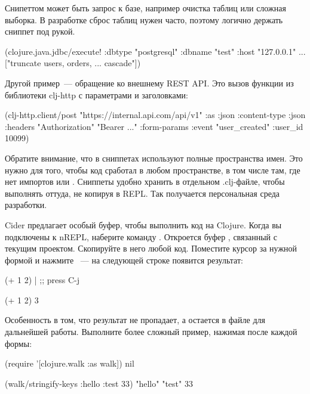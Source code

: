 Снипеттом может быть запрос к базе, например очистка таблиц или сложная выборка. В разработке сброс таблиц нужен часто, поэтому логично держать сниппет под рукой.

\begin{english}
  \begin{clojure}
(clojure.java.jdbc/execute!
 {:dbtype "postgresql"
  :dbname "test"
  :host "127.0.0.1"
  ...}
 ["truncate users, orders, ... cascade"])
  \end{clojure}
\end{english}

Другой пример~--- обращение ко внешнему REST API. Это вызов функции  из библиотеки clj-http с параметрами и заголовками:

\begin{english}
  \begin{clojure}
(clj-http.client/post
 "https://internal.api.com/api/v1"
 {:as :json
  :content-type :json
  :headers {"Authorization" "Bearer ..."}
  :form-params {:event "user_created"
                :user_id 10099}})
  \end{clojure}
\end{english}

Обратите внимание, что в сниппетах используют полные пространства имен. Это нужно для того, чтобы код сработал в любом пространстве, в том числе там, где нет импортов  или . Сниппеты удобно хранить в отдельном .clj-файле, чтобы выполнять оттуда, не копируя в REPL. Так получается персональная среда разработки.

Cider предлагает особый буфер, чтобы выполнить код на Clojure. Когда вы подключены к nREPL, наберите команду . Откроется буфер , связанный с текущим проектом. Скопируйте в него любой код. Поместите курсор за нужной формой и нажмите ~--- на следующей строке появится результат:

\begin{english}
  \begin{clojure}
(+ 1 2) | ;; press C-j

(+ 1 2)
3
  \end{clojure}
\end{english}

Особенность  в том, что результат не пропадает, а остается в файле для дальнейшей работы. Выполните более сложный пример, нажимая  после каждой формы:

\begin{english}
  \begin{clojure}
(require '[clojure.walk :as walk])
nil

(walk/stringify-keys {:hello {:test 33}})
{"hello" {"test" 33}}
  \end{clojure}
\end{english}

